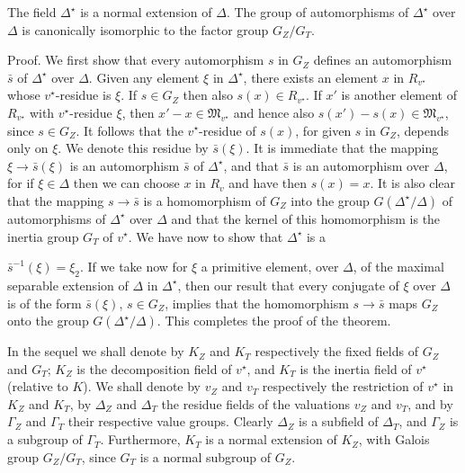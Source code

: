 The field $\Delta^{\star}$ is a normal extension of $\Delta$. The group of automorphisms of $\Delta^{\star}$ over $\Delta$ is canonically isomorphic to the factor group $G_Z/G_T$.

Proof. We first show that every automorphism $s$ in $G_Z$ defines an automorphism $\bar{s}$ of $\Delta^{\star}$ over $\Delta$. Given any element $\xi$ in $\Delta^{\star}$, there exists an element $x$ in $R_{v^{\star}}$ whose $v^{\star}$-residue is $\xi$. If $s \in G_Z$ then also $s(x) \in R_{v^{\star}}$. If $x'$ is another element of $R_{v^{\star}}$ with $v^{\star}$-residue $\xi$, then $x' - x \in \mathfrak{M}_{v^{\star}}$ and hence also $s(x') - s(x) \in \mathfrak{M}_{v^{\star}}$, since $s \in G_Z$. It follows that the $v^{\star}$-residue of $s(x)$, for given $s$ in $G_Z$, depends only on $\xi$. We denote this residue by $\bar{s}(\xi)$. It is immediate that the mapping $\xi \rightarrow \bar{s}(\xi)$ is an automorphism $\bar{s}$ of $\Delta^{\star}$, and that $\bar{s}$ is an automorphism over $\Delta$, for if $\xi \in \Delta$ then we can choose $x$ in $R_v$ and have then $s(x) = x$. It is also clear that the mapping $s \rightarrow \bar{s}$ is a homomorphism of $G_Z$ into the group $G(\Delta^{\star}/\Delta)$ of automorphisms of $\Delta^{\star}$ over $\Delta$ and that the kernel of this homomorphism is the inertia group $G_T$ of $v^{\star}$. We have now to show that $\Delta^{\star}$ is a

$\bar{s}^{-1}(\xi) = \xi_2$. If we take now for $\xi$ a primitive element, over $\Delta$, of the maximal separable extension of $\Delta$ in $\Delta^\star$, then our result that every conjugate of $\xi$ over $\Delta$ is of the form $\bar{s}(\xi)$, $s \in G_Z$, implies that the homomorphism $s \rightarrow \bar{s}$ maps $G_Z$ onto the group $G(\Delta^\star/\Delta)$. This completes the proof of the theorem.

In the sequel we shall denote by $K_Z$ and $K_T$ respectively the fixed fields of $G_Z$ and $G_T$; $K_Z$ is the decomposition field of $v^\star$, and $K_T$ is the inertia field of $v^\star$ (relative to $K$). We shall denote by $v_Z$ and $v_T$ respectively the restriction of $v^\star$ in $K_Z$ and $K_T$, by $\Delta_Z$ and $\Delta_T$ the residue fields of the valuations $v_Z$ and $v_T$, and by $\Gamma_Z$ and $\Gamma_T$ their respective value groups. Clearly $\Delta_Z$ is a subfield of $\Delta_T$, and $\Gamma_Z$ is a subgroup of $\Gamma_T$. Furthermore, $K_T$ is a normal extension of $K_Z$, with Galois group $G_Z/G_T$, since $G_T$ is a normal subgroup of $G_Z$.

